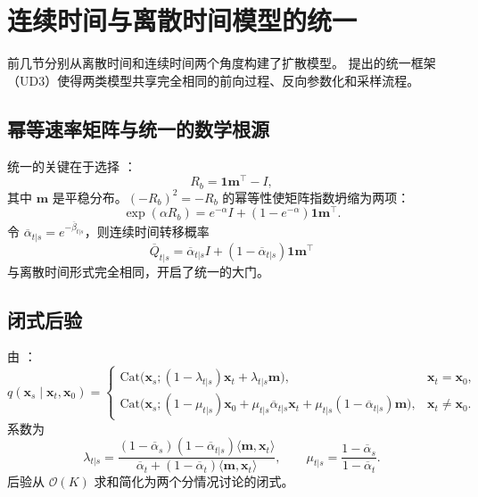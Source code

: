 \documentclass[12pt,a4paper]{ctexbook}
\theoremstyle{definition}
\begin{document}
\section{连续时间与离散时间模型的统一}
\label{sec:ud3}

前几节分别从离散时间和连续时间两个角度构建了扩散模型。
\cite{zhao2025ud3} 提出的统一框架（UD3）使得两类模型共享完全相同的前向过程、反向参数化和采样流程。

\subsection{幂等速率矩阵与统一的数学根源}

统一的关键在于选择 \cite[§2.1]{zhao2025ud3}：
\begin{equation}
R_b = \mathbf{1} \mathbf{m}^\top - I, \label{eq:idempotent}
\end{equation}
其中 $\mathbf{m}$ 是平稳分布。$(-R_b)^2 = -R_b$ 的幂等性使矩阵指数坍缩为两项：
\begin{equation}
\exp(\alpha R_b) = e^{-\alpha} I + (1 - e^{-\alpha}) \mathbf{1} \mathbf{m}^\top. \label{eq:exp-collapse}
\end{equation}
令 $\overline{\alpha}_{t|s} = e^{-\overline{\beta}_{t|s}}$，则连续时间转移概率
\begin{equation}
\overline{Q}_{t|s} = \overline{\alpha}_{t|s} I + (1 - \overline{\alpha}_{t|s}) \mathbf{1} \mathbf{m}^\top \label{eq:q-bar}
\end{equation}
与离散时间形式完全相同，开启了统一的大门。

\subsection{闭式后验}

由 \cite[§2.2 Proposition 2.1]{zhao2025ud3}：
\begin{equation}
q(\boldsymbol{x}_s \mid \boldsymbol{x}_t, \boldsymbol{x}_0) =
\begin{cases}
\text{Cat}\big(\boldsymbol{x}_s; (1 - \lambda_{t|s})\boldsymbol{x}_t + \lambda_{t|s} \mathbf{m}\big), & \boldsymbol{x}_t = \boldsymbol{x}_0, \\[6pt]
\text{Cat}\big(\boldsymbol{x}_s; (1 - \mu_{t|s})\boldsymbol{x}_0 + \mu_{t|s}\overline{\alpha}_{t|s}\boldsymbol{x}_t + \mu_{t|s}(1 - \overline{\alpha}_{t|s})\mathbf{m}\big), & \boldsymbol{x}_t \neq \boldsymbol{x}_0.
\end{cases} \label{eq:posterior}
\end{equation}
系数为
\begin{equation}
\lambda_{t|s} = \frac{(1 - \overline{\alpha}_s)(1 - \overline{\alpha}_{t|s}) \langle \mathbf{m}, \boldsymbol{x}_t \rangle}{\overline{\alpha}_t + (1 - \overline{\alpha}_t) \langle \mathbf{m}, \boldsymbol{x}_t \rangle},
\qquad
\mu_{t|s} = \frac{1 - \overline{\alpha}_s}{1 - \overline{\alpha}_t}. \label{eq:lambda-mu}
\end{equation}
后验从 $\mathcal{O}(K)$ 求和简化为两个分情况讨论的闭式。
\end{document}
